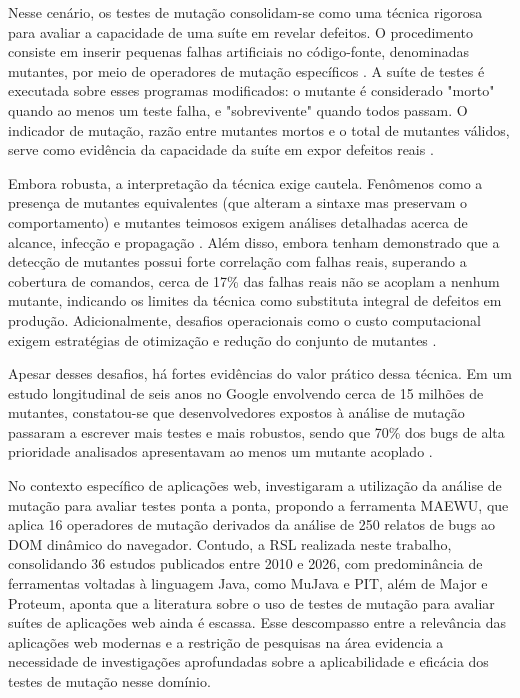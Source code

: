 Nesse cenário, os testes de mutação consolidam-se como uma técnica rigorosa para avaliar a capacidade de uma suíte em revelar defeitos. O procedimento consiste em inserir pequenas falhas artificiais no código-fonte, denominadas mutantes, por meio de operadores de mutação específicos \cite{guerino2024}. A suíte de testes é executada sobre esses programas modificados: o mutante é considerado "morto" quando ao menos um teste falha, e "sobrevivente" quando todos passam. O indicador de mutação, razão entre mutantes mortos e o total de mutantes válidos, serve como evidência da capacidade da suíte em expor defeitos reais \cite{just2014}.

Embora robusta, a interpretação da técnica exige cautela. Fenômenos como a presença de mutantes equivalentes (que alteram a sintaxe mas preservam o comportamento) e mutantes teimosos exigem análises detalhadas acerca de alcance, infecção e propagação \cite{yao2014}. Além disso, embora  tenham demonstrado que a detecção de mutantes possui forte correlação com falhas reais, superando a cobertura de comandos, cerca de 17\% das falhas reais não se acoplam a nenhum mutante, indicando os limites da técnica como substituta integral de defeitos em produção. Adicionalmente, desafios operacionais como o custo computacional exigem estratégias de otimização e redução do conjunto de mutantes \cite{kintis2010, guizzo2022}.

Apesar desses desafios, há fortes evidências do valor prático dessa técnica. Em um estudo longitudinal de seis anos no Google envolvendo cerca de 15 milhões de mutantes, constatou-se que desenvolvedores expostos à análise de mutação passaram a escrever mais testes e mais robustos, sendo que 70\% dos bugs de alta prioridade analisados apresentavam ao menos um mutante acoplado \cite{petrovic2021}.

No contexto específico de aplicações web,  investigaram a utilização da análise de mutação para avaliar testes ponta a ponta, propondo a ferramenta MAEWU, que aplica 16 operadores de mutação derivados da análise de 250 relatos de bugs ao DOM dinâmico do navegador. Contudo, a RSL realizada neste trabalho, consolidando 36 estudos publicados entre 2010 e 2026, com predominância de ferramentas voltadas à linguagem Java, como MuJava e PIT, além de Major e Proteum, aponta que a literatura sobre o uso de testes de mutação para avaliar suítes de aplicações web ainda é escassa. Esse descompasso entre a relevância das aplicações web modernas e a restrição de pesquisas na área evidencia a necessidade de investigações aprofundadas sobre a aplicabilidade e eficácia dos testes de mutação nesse domínio.

